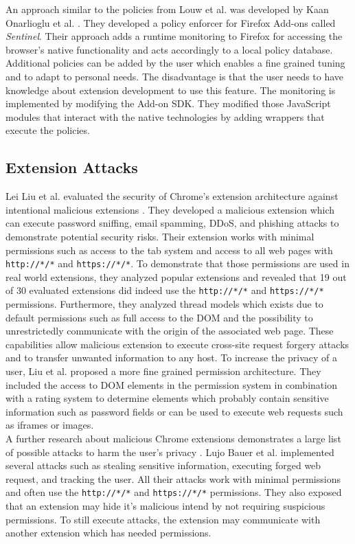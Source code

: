 		An approach similar to the policies from Louw et al. was developed by Kaan Onarlioglu et al. \cite{cs2015sentinel}. They developed a policy enforcer for Firefox Add-ons called \textit{Sentinel}. Their approach adds a runtime monitoring to Firefox for accessing the browser's native functionality and acts accordingly to a local policy database. Additional policies can be added by the user which enables a fine grained tuning and to adapt to personal needs. The disadvantage is that the user needs to have knowledge about extension development to use this feature. The monitoring is implemented by modifying the Add-on SDK. They modified those JavaScript modules that interact with the native technologies by adding wrappers that execute the policies. \\
		
	\subsection{Extension Attacks}
	
		Lei Liu et al. evaluated the security of Chrome's extension architecture against intentional malicious extensions \cite{Liu12chromeextensions:}. They developed a malicious extension which can execute password sniffing, email spamming, DDoS, and phishing attacks to demonstrate potential security risks. Their extension works with minimal permissions such as access to the tab system and access to all web pages with \texttt{http://*/*} and \texttt{https://*/*}. To demonstrate that those permissions are used in real world extensions, they analyzed popular extensions and revealed that 19 out of 30 evaluated extensions did indeed use the \texttt{http://*/*} and \texttt{https://*/*} permissions. Furthermore, they analyzed thread models which exists due to default permissions such as full access to the DOM and the possibility to unrestrictedly communicate with the origin of the associated web page. These capabilities allow malicious extension to execute cross-site request forgery attacks and to transfer unwanted information to any host. To increase the privacy of a user, Liu et al. proposed a more fine grained permission architecture. They included the access to DOM elements in the permission system in combination with a rating system to determine elements which probably contain sensitive information such as password fields or can be used to execute web requests such as iframes or images. \\
				
		A further research about malicious Chrome extensions demonstrates a large list of possible attacks to harm the user's privacy \cite{extensions:cns14}. Lujo Bauer et al. implemented several attacks such as stealing sensitive information, executing forged web request, and tracking the user. All their attacks work with minimal permissions and often use the \texttt{http://*/*} and \texttt{https://*/*} permissions. They also exposed that an extension may hide it's malicious intend by not requiring suspicious permissions. To still execute attacks, the extension may communicate with another extension which has needed permissions. \\
				
